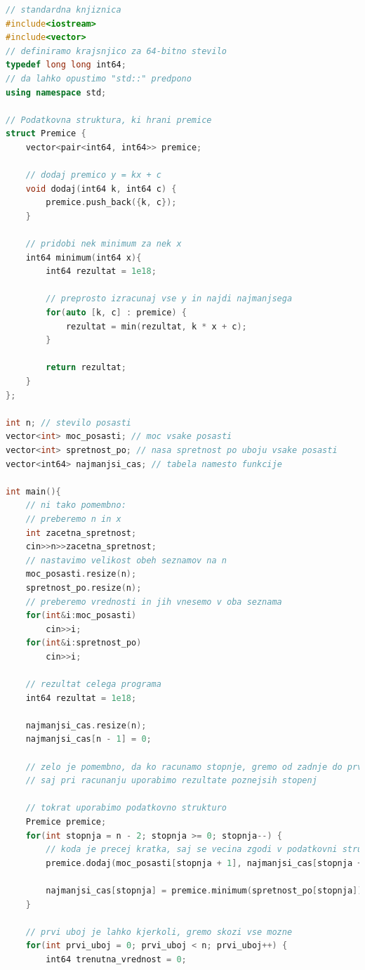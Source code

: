 \begin{lstlisting}[label={lst:code7}, language=C++]
// standardna knjiznica
#include<iostream>
#include<vector>
// definiramo krajsnjico za 64-bitno stevilo
typedef long long int64;
// da lahko opustimo "std::" predpono
using namespace std;

// Podatkovna struktura, ki hrani premice
struct Premice {
    vector<pair<int64, int64>> premice;

    // dodaj premico y = kx + c
    void dodaj(int64 k, int64 c) {
        premice.push_back({k, c});
    }

    // pridobi nek minimum za nek x
    int64 minimum(int64 x){
        int64 rezultat = 1e18;

        // preprosto izracunaj vse y in najdi najmanjsega
        for(auto [k, c] : premice) {
            rezultat = min(rezultat, k * x + c);
        }

        return rezultat;
    }
};

int n; // stevilo posasti
vector<int> moc_posasti; // moc vsake posasti
vector<int> spretnost_po; // nasa spretnost po uboju vsake posasti
vector<int64> najmanjsi_cas; // tabela namesto funkcije

int main(){
    // ni tako pomembno:
    // preberemo n in x
    int zacetna_spretnost;
    cin>>n>>zacetna_spretnost;
    // nastavimo velikost obeh seznamov na n
    moc_posasti.resize(n);
    spretnost_po.resize(n);
    // preberemo vrednosti in jih vnesemo v oba seznama
    for(int&i:moc_posasti)
        cin>>i;
    for(int&i:spretnost_po)
        cin>>i;

    // rezultat celega programa
    int64 rezultat = 1e18;

    najmanjsi_cas.resize(n);
    najmanjsi_cas[n - 1] = 0;

    // zelo je pomembno, da ko racunamo stopnje, gremo od zadnje do prve,
    // saj pri racunanju uporabimo rezultate poznejsih stopenj

    // tokrat uporabimo podatkovno strukturo
    Premice premice;
    for(int stopnja = n - 2; stopnja >= 0; stopnja--) {
        // koda je precej kratka, saj se vecina zgodi v podatkovni strukturi Premice
        premice.dodaj(moc_posasti[stopnja + 1], najmanjsi_cas[stopnja + 1]);

        najmanjsi_cas[stopnja] = premice.minimum(spretnost_po[stopnja]);
    }

    // prvi uboj je lahko kjerkoli, gremo skozi vse mozne
    for(int prvi_uboj = 0; prvi_uboj < n; prvi_uboj++) {
        int64 trenutna_vrednost = 0;


\end{lstlisting}
